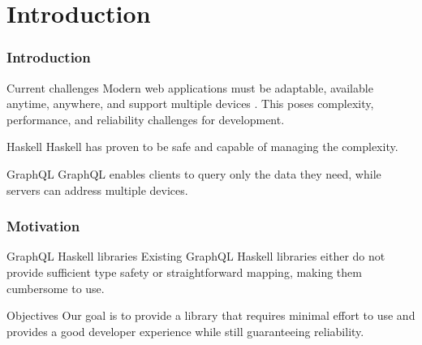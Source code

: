 \section{Introduction}

\begin{frame}\frametitle{Introduction}

    \begin{block}{Current challenges}
        Modern web applications must be adaptable, available anytime, anywhere, and support multiple devices \cite{char-of-modern-web-app}. This poses complexity, performance, and reliability challenges for development.  
    \end{block}

    \begin{block}{Haskell} Haskell has proven to be safe and capable of managing the complexity. 
    \end{block}

    \begin{block}{GraphQL} GraphQL enables clients to query only the data they need, while servers can address multiple devices.
    \end{block}

\end{frame}

\begin{frame}\frametitle{Motivation}

\begin{block}{GraphQL Haskell libraries}
    Existing GraphQL Haskell libraries either do not provide sufficient type safety or straightforward mapping, making them cumbersome to use.
\end{block}

\begin{block}{Objectives}
Our goal is to provide a library that requires minimal effort to use and provides a good developer experience while still guaranteeing reliability.
\end{block}

\end{frame}